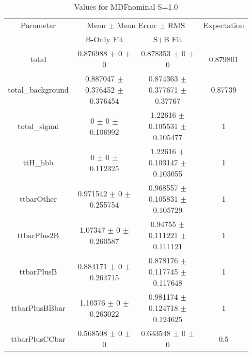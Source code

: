 \begin{table}
\centering
\caption{Values for MDFnominal S=1.0}
\begin{tabular}{cccc}
\toprule
Parameter & \multicolumn{2}{c}{Mean $\pm$ Mean Error $\pm$ RMS} & Expectation\\
 & B-Only Fit & S+B Fit & \\
\midrule
total & \num{0.876988} $\pm$ \num{0} $\pm$ \num{0} & \num{0.878353} $\pm$ \num{0} $\pm$ \num{0} & \num{0.879801}\\
total\_background & \num{0.887047} $\pm$ \num{0.376452} $\pm$ \num{0.376454} & \num{0.874363} $\pm$ \num{0.377671} $\pm$ \num{0.37767} & \num{0.87739}\\
total\_signal & \num{0} $\pm$ \num{0} $\pm$ \num{0.106992} & \num{1.22616} $\pm$ \num{0.105531} $\pm$ \num{0.105477} & \num{1}\\
ttH\_hbb & \num{0} $\pm$ \num{0} $\pm$ \num{0.112325} & \num{1.22616} $\pm$ \num{0.103147} $\pm$ \num{0.103055} & \num{1}\\
ttbarOther & \num{0.971542} $\pm$ \num{0} $\pm$ \num{0.255754} & \num{0.968557} $\pm$ \num{0.105831} $\pm$ \num{0.105729} & \num{1}\\
ttbarPlus2B & \num{1.07347} $\pm$ \num{0} $\pm$ \num{0.260587} & \num{0.94755} $\pm$ \num{0.111221} $\pm$ \num{0.111121} & \num{1}\\
ttbarPlusB & \num{0.884171} $\pm$ \num{0} $\pm$ \num{0.264715} & \num{0.878176} $\pm$ \num{0.117745} $\pm$ \num{0.117648} & \num{1}\\
ttbarPlusBBbar & \num{1.10376} $\pm$ \num{0} $\pm$ \num{0.263022} & \num{0.981174} $\pm$ \num{0.124718} $\pm$ \num{0.124625} & \num{1}\\
ttbarPlusCCbar & \num{0.568508} $\pm$ \num{0} $\pm$ \num{0} & \num{0.633548} $\pm$ \num{0} $\pm$ \num{0} & \num{0.5}\\
\bottomrule
\end{tabular}
\end{table}
